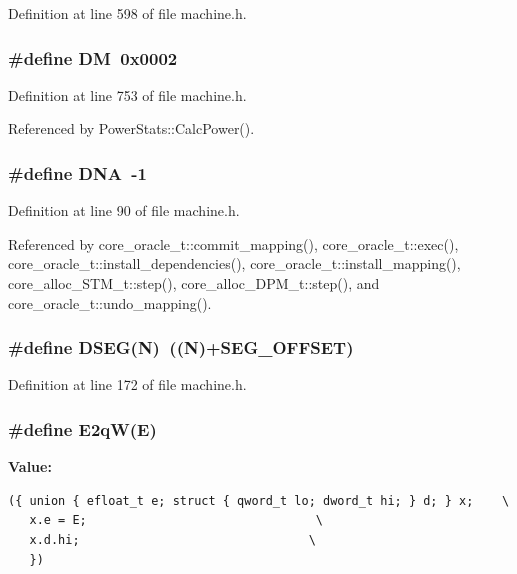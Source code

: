 Definition at line 598 of file machine.h.
\subsubsection[{DM}]{\setlength{\rightskip}{0pt plus 5cm}\#define DM~0x0002}\label{machine_8h_9a9aac904e687286501946469e2903d6}




Definition at line 753 of file machine.h.

Referenced by PowerStats::CalcPower().
\subsubsection[{DNA}]{\setlength{\rightskip}{0pt plus 5cm}\#define DNA~-1}\label{machine_8h_7e1f80c2888e5e4d779d8571e66ae50d}




Definition at line 90 of file machine.h.

Referenced by core\_\-oracle\_\-t::commit\_\-mapping(), core\_\-oracle\_\-t::exec(), core\_\-oracle\_\-t::install\_\-dependencies(), core\_\-oracle\_\-t::install\_\-mapping(), core\_\-alloc\_\-STM\_\-t::step(), core\_\-alloc\_\-DPM\_\-t::step(), and core\_\-oracle\_\-t::undo\_\-mapping().
\subsubsection[{DSEG}]{\setlength{\rightskip}{0pt plus 5cm}\#define DSEG(N)~((N)+SEG\_\-OFFSET)}\label{machine_8h_835830e44d73023be784b150846de289}




Definition at line 172 of file machine.h.
\subsubsection[{E2qW}]{\setlength{\rightskip}{0pt plus 5cm}\#define E2qW(E)}\label{machine_8h_0987463bbada0862d670e47a47af4b9a}


\textbf{Value:}

\begin{Code}\begin{verbatim}({ union { efloat_t e; struct { qword_t lo; dword_t hi; } d; } x;    \
   x.e = E;                                \
   x.d.hi;                                \
   })
\end{verbatim}
\end{Code}


